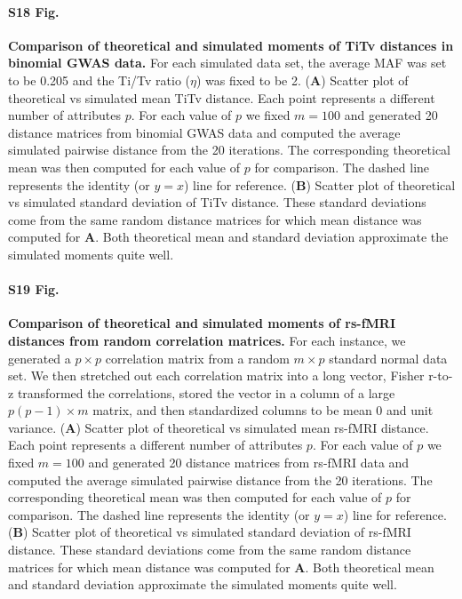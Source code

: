 \documentclass[10pt,letterpaper]{article}
\begin{document}
\paragraph*{S18 Fig.}
\hypertarget{S18_Fig}{
{\bf Comparison of theoretical and simulated moments of TiTv distances in binomial GWAS data.} For each simulated data set, the average MAF was set to be 0.205 and the Ti/Tv ratio ($\eta$) was fixed to be 2. (\textbf{A}) Scatter plot of theoretical vs simulated mean TiTv distance. Each point represents a different number of attributes $p$. For each value of $p$ we fixed $m=100$ and generated 20 distance matrices from binomial GWAS data and computed the average simulated pairwise distance from the 20 iterations. The corresponding theoretical mean was then computed for each value of $p$ for comparison. The dashed line represents the identity (or $y=x$) line for reference. (\textbf{B}) Scatter plot of theoretical vs simulated standard deviation of TiTv distance. These standard deviations come from the same random distance matrices for which mean distance was computed for \textbf{A}. Both theoretical mean and standard deviation approximate the simulated moments quite well.}

\paragraph*{S19 Fig.}
\hypertarget{S19_Fig}{
{\bf Comparison of theoretical and simulated moments of rs-fMRI distances from random correlation matrices.} For each instance, we generated a $p \times p$ correlation matrix from a random $m \times p$ standard normal data set. We then stretched out each correlation matrix into a long vector, Fisher r-to-z transformed the correlations, stored the vector in a column of a large $p(p-1) \times m$ matrix, and then standardized columns to be mean 0 and unit variance. (\textbf{A}) Scatter plot of theoretical vs simulated mean rs-fMRI distance. Each point represents a different number of attributes $p$. For each value of $p$ we fixed $m=100$ and generated 20 distance matrices from rs-fMRI data and computed the average simulated pairwise distance from the 20 iterations. The corresponding theoretical mean was then computed for each value of $p$ for comparison. The dashed line represents the identity (or $y=x$) line for reference. (\textbf{B}) Scatter plot of theoretical vs simulated standard deviation of rs-fMRI distance. These standard deviations come from the same random distance matrices for which mean distance was computed for \textbf{A}. Both theoretical mean and standard deviation approximate the simulated moments quite well.}
\end{document}
